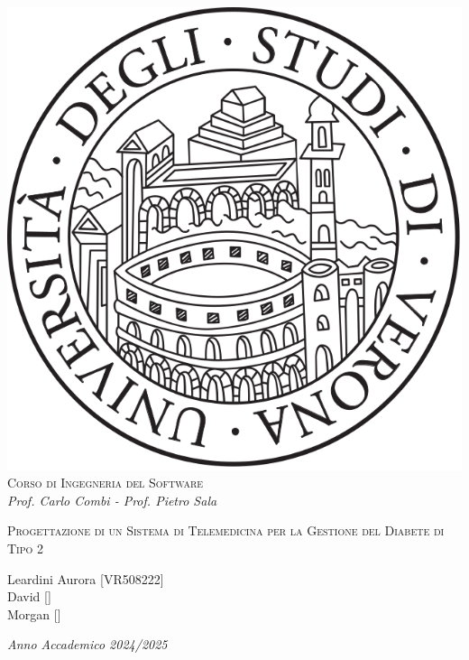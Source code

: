 \begin{titlepage}
\begin{center}
\begin{spacing}{1.5}
\includegraphics[width=.2\textwidth, height=.2\textheight, keepaspectratio]{figures/verona.png}\\
{{\Large{\textsc{Corso di Ingegneria del Software}}}}\\
{\large{\it Prof. Carlo Combi - Prof. Pietro Sala}}
\end{spacing}
\end{center}
\vspace{15mm}
\begin{center}
\begin{spacing}{1.5}

{\large }

{\LARGE{\textsc{Progettazione di un Sistema di Telemedicina per la Gestione del Diabete di Tipo 2}}}\\
\begin{center}
\vspace{35mm}
{\large{\textsc Leardini Aurora [VR508222] \\David [] \\Morgan []}}
\end{center}
\end{spacing}
\end{center}
\par
\noindent
\vspace{45mm}
\begin{center}
{\large{\it Anno Accademico 2024/2025 }}
\end{center}
\end{titlepage}
